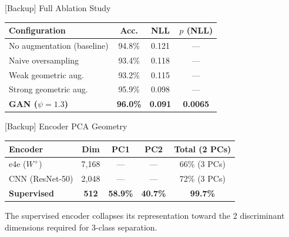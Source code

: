 \documentclass[aspectratio=169]{beamer}
\begin{document}
\begin{frame}{[Backup] Full Ablation Study}
  \begin{center}
  \begin{tabular}{lccc}
    \toprule
    Configuration & Acc. & NLL & $p$ (NLL) \\
    \midrule
    No augmentation (baseline) & 94.8\% & 0.121 & --- \\
    Naive oversampling          & 93.4\% & 0.118 & --- \\
    Weak geometric aug.         & 93.2\% & 0.115 & --- \\
    Strong geometric aug.       & 95.9\% & 0.098 & --- \\
    \textbf{GAN ($\psi=1.3$)}  & \textbf{96.0\%} & \textbf{0.091} & \textbf{0.0065} \\
    \bottomrule
  \end{tabular}
  \end{center}
\end{frame}

\begin{frame}{[Backup] Encoder PCA Geometry}
  \begin{center}
  \begin{tabular}{lcccc}
    \toprule
    Encoder & Dim & PC1 & PC2 & Total (2 PCs) \\
    \midrule
    e4e ($W^+$)          & 7{,}168 & --- & --- & 66\% (3 PCs) \\
    CNN (ResNet-50)       & 2{,}048 & --- & --- & 72\% (3 PCs) \\
    \textbf{Supervised}  & \textbf{512} & \textbf{58.9\%} & \textbf{40.7\%} & \textbf{99.7\%} \\
    \bottomrule
  \end{tabular}
  \end{center}
  \vspace{0.3em}
  The supervised encoder collapses its representation toward the 2 discriminant
  dimensions required for 3-class separation.
\end{frame}


\newcommand{\gradcam}{img/gradcam}
\newcommand{\realfake}{img/realfake}
\newcommand{\proj}{img/projections}
\newcommand{\inttest}{img/inttest}
\newcommand{\cnnfold}{img/cnnfold}

\end{document}
